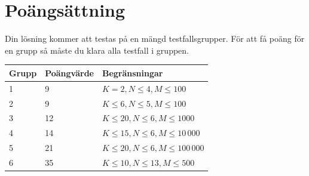 \section*{Poängsättning}
Din lösning kommer att testas på en mängd testfallsgrupper. För att få poäng för en grupp så måste du klara alla testfall i gruppen.

\begin{tabular}{| l | l | l |}
	\hline
	Grupp & Poängvärde & Begränsningar\\ \hline
	1     & 9          & $K = 2, N \le 4, M \le 100$ \\ \hline
	2     & 9          & $K \le 6, N \le 5, M \le 100$ \\ \hline
	3     & 12         & $K \le 20, N \le 6, M \le 1000$ \\ \hline
	4     & 14         & $K \le 15, N \le 6, M \le 10\,000$ \\ \hline
	5     & 21         & $K \le 20, N \le 6, M \le 100\,000$ \\ \hline
	6     & 35         & $K \le 10, N \le 13, M \le 500$ \\ \hline
\end{tabular}
